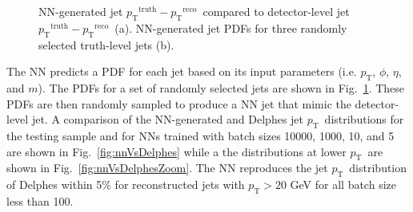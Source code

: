 \documentclass[showpacs,showkeys,preprint,prd,nofootinbib,linenumbers,12pt]{revtex4-1}
\def\pt{\ensuremath{p_{\mathrm{T}}}}
\def\ptRes{\ensuremath{\pt^{\mathrm{truth}}-\pt^{\mathrm{reco}}}}
\begin{document}
\begin{figure}[htb]
  \caption{NN-generated jet \ptRes\ compared to detector-level jet \ptRes\ (a). NN-generated jet PDFs for three randomly selected truth-level jets (b).}
  \label{fig:pdfComp}
\end{figure}

The NN predicts a PDF for each jet based on its input parameters (i.e. \pt, $\phi$, $\eta$, and $m$). The PDFs for a set of randomly selected jets are shown in Fig.~\ref{fig:pdfComp}. These PDFs are then randomly sampled to produce a NN jet that mimic the detector-level jet. A comparison of the NN-generated and Delphes jet \pt\ distributions for the testing sample and for NNs trained with batch sizes 10000, 1000, 10, and 5 are shown in Fig.~\ref{fig:nnVsDelphes} while a the distributions at lower \pt\ are shown in Fig.~\ref{fig:nnVsDelphesZoom}. The NN reproduces the jet \pt\ distribution of Delphes within 5\% for reconstructed jets with $\pt>20$ GeV for all batch size less than 100. 
\end{document}

